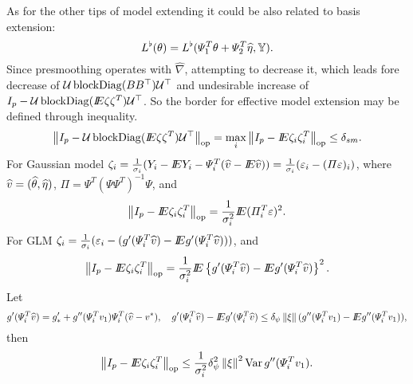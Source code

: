 As for the other tips of model extending it could be also related to basis extension:  
\[
L^{\flat}(\theta)  = L^{\flat}( \varPsi_1^T \theta +  \varPsi_2^T \widehat{\eta}, \mathbb{Y}). 
\]
Since presmoothing operates with $\widehat{\nabla}$, attempting to decrease it, which leads fore decrease of $\mathcal{U} \operatorname{blockDiag}(BB^{\top})\mathcal{U}^{\top}$ and undesirable increase of $ I_{p} -  \mathcal{U} \operatorname{blockDiag}(I\!\!E \zeta \zeta^{T}) \mathcal{U}^{\top} $.  So the border for effective model extension may be defined through inequality.
\[
\left\Vert I_{p} -  \mathcal{U} \operatorname{blockDiag}(I\!\!E \zeta \zeta^{T}) \mathcal{U}^{\top}  \right\Vert_{\operatorname{op}} = \max_{i} \left\Vert  I_p - I\!\!E \zeta_i \zeta_i^{T}   \right\Vert_{\operatorname{op}} \leq  \delta_{sm}.
\]   
For Gaussian model $\zeta_i = \frac{1}{\sigma_i }  ( Y_i -  I\!\!E Y_i - \varPsi_i^T (\widehat{v} - I\!\!E \widehat{v}) ) = \frac{1}{\sigma_i} (\varepsilon_i - (\varPi \varepsilon)_i)$, where $\widehat{v} = (\widehat{\theta}, \widehat{\eta})$, $\Pi = \Psi^T (\Psi\Psi^T)^{-1} \Psi $, and 
\[
\left\Vert  I_p - I\!\!E \zeta_i \zeta_i^{T}   \right\Vert_{\operatorname{op}} = \frac{1}{\sigma^2_i}  I\!\!E  (\varPi_i^T \varepsilon)^2.
\]
For GLM  $\zeta_i = \frac{1}{\sigma_i }  ( \varepsilon_i -  ( g'(\varPsi_i^T \widehat{v} ) - I\!\!E g' ( \varPsi_i^T\widehat{v}) ) ) $, and 
\[
\left\Vert  I_p - I\!\!E \zeta_i \zeta_i^{T}   \right\Vert_{\operatorname{op}} = \frac{1}{\sigma^2_i}  I\!\!E  \left \{ g'(\varPsi_i^T \widehat{v} ) - I\!\!E g' ( \varPsi_i^T\widehat{v})   \right \}^2.
\]
Let 
\[
 g' ( \varPsi_i^T\widehat{v})  = g'_*  +  g'' ( \varPsi_i^T v_1) \varPsi_i^T (\widehat{v} - v^*) ,
\quad 
g'(\varPsi_i^T \widehat{v} ) - I\!\!E g' ( \varPsi_i^T\widehat{v}) \leq  \delta_{\psi} \left\Vert \xi \right\Vert ( g''(\varPsi_i^T v_1) - I\!\!E g'' ( \varPsi_i^T v_1)  ), 
\]
then 
\[
\left\Vert  I_p - I\!\!E \zeta_i \zeta_i^{T}   \right\Vert_{\operatorname{op}} \leq \frac{1}{\sigma^2_i}  \delta_{\psi}^2 \left\Vert \xi \right\Vert^2  \operatorname{Var}  g''(\varPsi_i^T v_1 ).
\]

